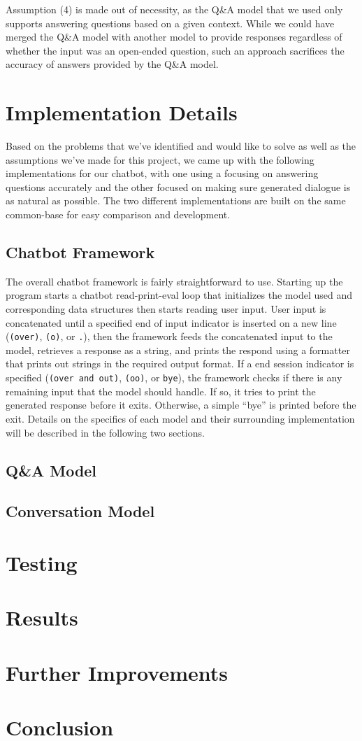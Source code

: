 Assumption (4) is made out of necessity, as the Q\&A model that we used only
supports answering questions based on a given context. While we could have merged
the Q\&A model with another model to provide responses regardless of whether the
input was an open-ended question, such an approach sacrifices the accuracy of
answers provided by the Q\&A model.

\section{Implementation Details}

Based on the problems that we've identified and would like to solve as well as
the assumptions we've made for this project, we came up with the following
implementations for our chatbot, with one using a focusing on answering
questions accurately and the other focused on making sure generated dialogue is
as natural as possible. The two different implementations are built on the same
common-base for easy comparison and development.

\subsection{Chatbot Framework}

The overall chatbot framework is fairly straightforward to use. Starting up the
program starts a chatbot read-print-eval loop that initializes the model used
and corresponding data structures then starts reading user input. User input is
concatenated until a specified end of input indicator is inserted on a new line
(\verb|(over)|, \verb|(o)|, or \verb|.|), then the framework feeds the
concatenated input to the model, retrieves a response as a string, and prints
the respond using a formatter that prints out strings in the required output
format. If a end session indicator is specified (\verb|(over and out)|,
\verb|(oo)|, or \verb|bye|), the framework checks if there is any remaining
input that the model should handle. If so, it tries to print the generated
response before it exits. Otherwise, a simple ``bye'' is printed before the
exit. Details on the specifics of each model and their surrounding
implementation will be described in the following two sections.

\subsection{Q\&A Model}

\subsection{Conversation Model}

\section{Testing}

\section{Results}

\section{Further Improvements}

\section{Conclusion}
